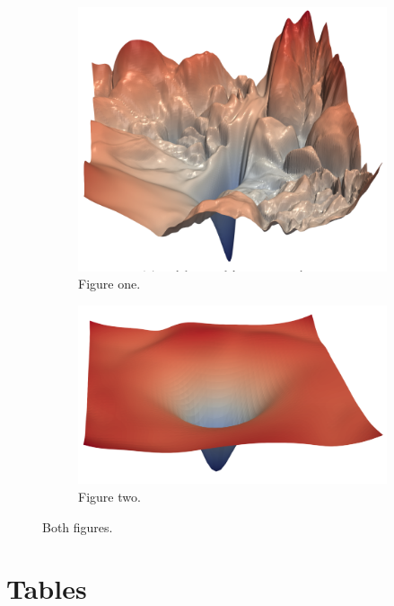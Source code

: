 \documentclass{article} %
\begin{document}
\begin{figure}[H]
    \centering
    \begin{subfigure}{0.45\textwidth}
        \includegraphics[width=\linewidth]{images/mse-visu-1}
        \caption{Figure one.}
        \label{fig:mse-visu-1}
    \end{subfigure}    
    \hfill
    \begin{subfigure}{0.45\textwidth}
        \includegraphics[width=\linewidth]{images/mse-visu-2}
        \caption{Figure two.}
        \label{fig:mse-visu-2}
    \end{subfigure}
    \caption{Both figures.}
    \label{fig:mse-visu-12}
\end{figure}

\section{Tables}
\end{document}
